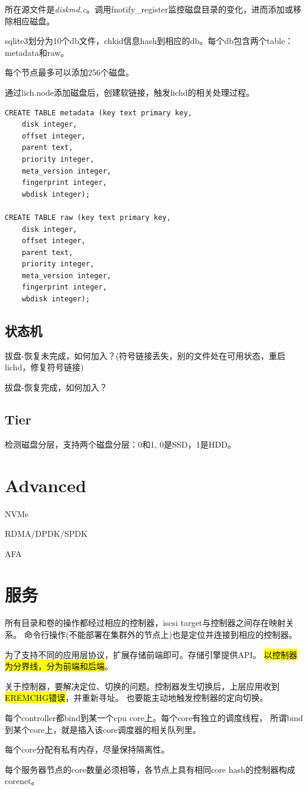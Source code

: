 所在源文件是\emph{diskmd.c}。调用fnotify\_register监控磁盘目录的变化，进而添加或移除相应磁盘。

sqlite3划分为10个db文件，chkid信息hash到相应的db。每个db包含两个table：metadata和raw。

每个节点最多可以添加256个磁盘。

通过lich.node添加磁盘后，创建软链接，触发lichd的相关处理过程。

\begin{lstlisting}[frame=single]
CREATE TABLE metadata (key text primary key,
    disk integer,
    offset integer,
    parent text,
    priority integer,
    meta_version integer,
    fingerprint integer,
    wbdisk integer);

CREATE TABLE raw (key text primary key,
    disk integer,
    offset integer,
    parent text,
    priority integer,
    meta_version integer,
    fingerprint integer,
    wbdisk integer);
\end{lstlisting}

\subsection{状态机}

拔盘-恢复未完成，如何加入？(符号链接丢失，别的文件处在可用状态，重启lichd，修复符号链接)

拔盘-恢复完成，如何加入？

\subsection{Tier}

检测磁盘分层，支持两个磁盘分层：0和1, 0是SSD，1是HDD。

\section{Advanced}

NVMe

RDMA/DPDK/SPDK

AFA

\section{服务}

所有目录和卷的操作都经过相应的控制器，iscsi target与控制器之间存在映射关系。
命令行操作(不能部署在集群外的节点上)也是定位并连接到相应的控制器。

为了支持不同的应用层协议，扩展存储前端即可。存储引擎提供API。
\hl{以控制器为分界线，分为前端和后端}。

关于控制器，要解决定位、切换的问题。控制器发生切换后，上层应用收到\hl{EREMCHG错误}，并重新寻址。
也要能主动地触发控制器的定向切换。

每个controller都bind到某一个cpu core上。每个core有独立的调度线程，
所谓bind到某个core上，就是插入该core调度器的相关队列里。

每个core分配有私有内存，尽量保持隔离性。

每个服务器节点的core数量必须相等，各节点上具有相同core hash的控制器构成corenet。
